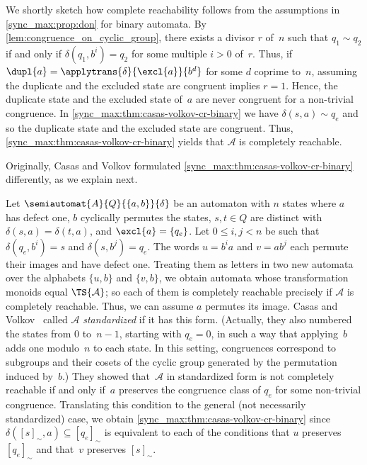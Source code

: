 \begin{remark}
	We shortly sketch how complete reachability follows
	from the assumptions in \cref{sync_max:prop:don} for binary automata.
	By \cref{lem:congruence_on_cyclic_group}, there exists a divisor $r$ of~$n$
	such that $q_1 \sim q_2$ if and only if 
	$\delta(q_1, b^i) = q_2$ for some multiple $i > 0$ of~$r$.
	Thus, if $\dupl{a}= \applytrans{\delta}{\excl{a}}{b^d}$
	for some $d$ coprime to~$n$, assuming the duplicate and the excluded
	state are congruent implies $r = 1$.
	Hence, the duplicate state and the excluded state of~$a$ are never
	congruent for a non-trivial congruence.
	In \cref{sync_max:thm:casas-volkov-cr-binary}
	we have $\delta(s, a) \sim q_e$ and so the duplicate state and
	the excluded state are congruent.
	Thus, \cref{sync_max:thm:casas-volkov-cr-binary} yields 
	that $\mathcal A$ is completely reachable.
\end{remark}

Originally, Casas and Volkov formulated \cref{sync_max:thm:casas-volkov-cr-binary} 
differently, as we explain next.

\begin{remark} \label{syncmax:rem:standardized}
	Let $\semiautomat{A}{Q}{\{a,b\}}{\delta}$
	be an automaton with $n$ states where $a$ has defect one, $b$ cyclically permutes the states, $s,t \in Q$ are distinct with $\delta(s, a) = \delta(t, a)$, and $\excl{a} = \{q_e\}$.
	Let $0 \le i,j < n$ be such that $\delta(q_e, b^i) = s$
	and $\delta(s, b^j) = q_e$. The words $u = b^ia$ and $v = ab^j$ each
	permute their images and have defect one. Treating them as letters in two
	new automata over the alphabets $\{u,b\}$ and $\{v,b\}$,
	we obtain automata whose transformation monoids equal $\TS{\mathcal A}$;
	so each of them is completely reachable precisely if $\mathcal A$
	is completely reachable. Thus, we can assume $a$ permutes its image.	
	Casas and Volkov~\cite{DBLP:conf/latin/CasasV22} called $\mathcal A$ \emph{standardized}
	if it has this form. (Actually, they also numbered the states from $0$ to~$n - 1$,
	starting with $q_e = 0$, in such a way that applying~$b$ adds one modulo~$n$
	to each state. In this setting, congruences correspond to subgroups and their
	cosets of the cyclic group generated by the permutation induced by~$b$.)
	They showed that~$\mathcal A$ in standardized form is not completely reachable
	if and only if~$a$ preserves the congruence class of $q_e$ for some
	non-trivial congruence.
	Translating this condition to the general (not necessarily standardized) case,
	we obtain \cref{sync_max:thm:casas-volkov-cr-binary} 
	since $\delta([s]_{\sim}, a) \subseteq [q_e]_{\sim}$
	is equivalent to each of the conditions
	that $u$ preserves $[q_e]_{\sim}$ and that~$v$ preserves $[s]_{\sim}$.
\end{remark}

